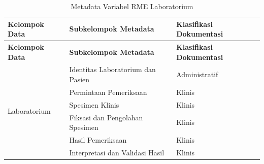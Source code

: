\begin{longtable}{|p{4cm}|p{5.2cm}|p{3.2cm}|}
	\caption{Metadata Variabel RME Laboratorium}
	\label{tab:metadata-rme-laboratorium}                             \\
	\hline
	\textbf{Kelompok Data}        &
	\textbf{Subkelompok Metadata} &
	\textbf{Klasifikasi Dokumentasi}                                  \\ \hline
	\endfirsthead

	\hline
	\textbf{Kelompok Data}        &
	\textbf{Subkelompok Metadata} &
	\textbf{Klasifikasi Dokumentasi}                                  \\ \hline
	\endhead

	\multirow{7}{4cm}{Laboratorium}
	                              & Identitas Laboratorium dan Pasien
	                              & Administratif                     \\ \cline{2-3}

	                              & Permintaan Pemeriksaan
	                              & Klinis                            \\ \cline{2-3}

	                              & Spesimen Klinis
	                              & Klinis                            \\ \cline{2-3}

	                              & Fiksasi dan Pengolahan Spesimen
	                              & Klinis                            \\ \cline{2-3}

	                              & Hasil Pemeriksaan
	                              & Klinis                            \\ \cline{2-3}

	                              & Interpretasi dan Validasi Hasil
	                              & Klinis                            \\ \hline
\end{longtable}

